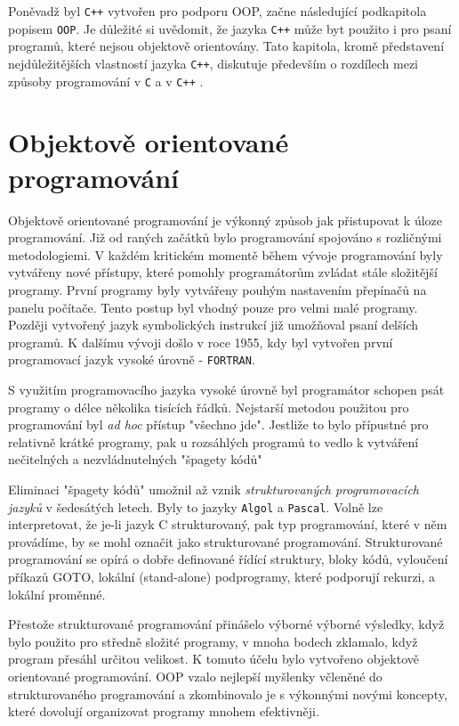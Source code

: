 {    Poněvadž byl \texttt{C++} vytvořen pro podporu OOP, začne následující podkapitola popis\-em 
    \texttt{OOP}. Je důležité si uvědomit, že jazyka \texttt{C++} může byt použito i pro psaní 
    programů, které nejsou objektově orientovány. Tato kapitola, kromě představení nejdůležitějších 
    vlastností jazyka \texttt{C++}, diskutuje především o rozdílech mezi způsoby programování v 
    \texttt{C} a v \texttt{C++} \cite[p.~20]{Schildt}.
  
  \section{Objektově orientované programování}
    Objektově orientované programování je výkonný způsob jak přistupovat k úloze programování. Již 
    od raných začátků bylo programování spojováno s rozličnými metodologiemi. V každém kritickém 
    momentě během vývoje programování byly vytvářeny nové přístupy, které pomohly programátorům 
    zvládat stále složitější programy. První programy byly vytvářeny pouhým nastavením přepínačů na 
    panelu počítače. Tento postup byl vhodný pouze pro velmi malé programy. Později vytvořený jazyk 
    symbolických instrukcí již umožňoval psaní delších programů. K dalšímu vývoji došlo v roce 
    1955, kdy byl vytvořen první programovací jazyk vysoké úrovně - \texttt{FORTRAN}.
  
    S využitím programovacího jazyka vysoké úrovně byl programátor schopen psát programy o délce 
    několika tisících řádků. Nejstarší metodou použitou pro programování byl \emph{ad hoc} přístup 
    "všechno jde". Jestliže to bylo přípustné pro relativně krátké programy, pak u rozsáhlých 
    programů to vedlo k vytváření nečitelných a nezvládnutelných "špagety kódů"
  
    Eliminaci "špagety kódů" umožnil až vznik \emph{strukturovaných programovacích jazyků} v 
    šedesátých letech. Byly to jazyky \texttt{Algol} a \texttt{Pascal}. Volně lze interpretovat, že 
    je-li jazyk C strukturovaný, pak typ programování, které v něm provádíme, by se mohl označit 
    jako strukturované programování. Strukturované programování se opírá o dobře definované řídící 
    struktury, bloky kódů, vyloučení příkazů GOTO, lokální (stand-alone) podprogramy, které 
    podporují rekurzi, a lokální proměnné.
  
    Přestože strukturované programování přinášelo výborné výborné výsledky, když bylo použito pro 
    středně složité programy, v mnoha bodech zklamalo, když program přesáhl určitou velikost. K 
    tomuto účelu bylo vytvořeno objektově orientované programování. OOP vzalo nejlepší myšlenky 
    včleněné do strukturovaného programování a zkombinovalo je s výkonnými novými koncepty, které 
    dovolují organizovat programy mnohem efektivněji.
  
}
